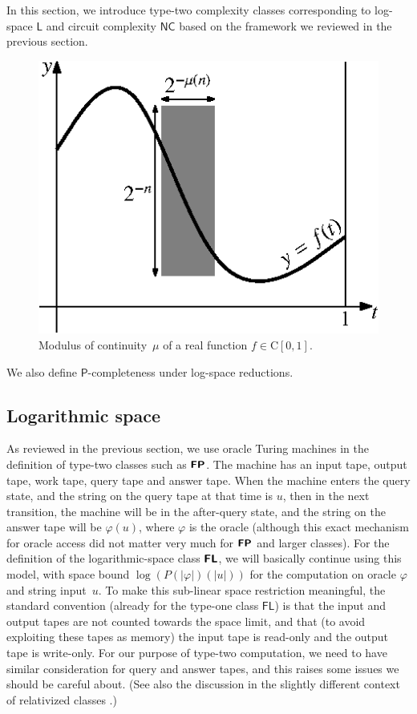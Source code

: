 \documentclass[envcountsect,envcountsame,orivec,oribibl]{llncs}
\newcommand{\classonefont}[1]{\mathsf{#1}}
\newcommand{\classL}{\classonefont{L}}
\newcommand{\classFL}{\classonefont{FL}}
\newcommand{\classP}{\classonefont{P}}
\newcommand{\classNC}{\classonefont{NC}}
\newcommand{\classtwofont}[1]{\text{\bfseries \sffamily \upshape #1}}
\newcommand{\classFLtwo}{\classtwofont{FL}}
\newcommand{\classFPtwo}{\classtwofont{FP}}
\newcommand{\classC}{\mathrm C}
\begin{document}
In this section, we introduce type-two complexity classes
corresponding to log-space $\classL$ and circuit complexity $\classNC$
based on the framework we reviewed in the previous section.
\begin{figure}
\begin{center}
\includegraphics[scale=0.9]{./moc.eps}
\caption{Modulus of continuity~$\mu$ of a real function $f \in \classC [0, 1]$.}
\label{figure: moc}
\end{center}
\end{figure}
We also define $\classP$-completeness under log-space reductions.

\subsection{Logarithmic space}
\label{subsection: logspace}

As reviewed in the previous section, 
we use oracle Turing machines in the definition of type-two classes 
such as $\classFPtwo$. 
The machine has an input tape, output tape, work tape, query tape and answer tape. 
When the machine enters the query state, 
and the string on the query tape at that time is $u$, 
then in the next transition, 
the machine will be in the after-query state, and 
the string on the answer tape will be $\varphi (u)$, 
where $\varphi$ is the oracle
(although this exact mechanism for oracle access did not matter very much
for $\classFPtwo$ and larger classes). 
For the definition of 
the logarithmic-space class $\classFLtwo$, 
we will basically continue using this model, 
with space bound $\log (P (\lvert \varphi \rvert) (\lvert u \rvert))$
for the computation on oracle $\varphi$ and string input~$u$. 
To make this sub-linear space restriction meaningful, 
the standard convention (already for the type-one class $\classFL$) is that 
the input and output tapes are not counted towards the space limit, and that 
(to avoid exploiting these tapes as memory) 
the input tape is read-only and the output tape is write-only. 
For our purpose of type-two computation, 
we need to have similar consideration for query and answer tapes, 
and this raises some issues we should be careful about. 
(See also the discussion in the slightly different context of relativized classes 
\cite{aehlig2007relativizing,buss1988relativized,ladner1976relativization,wilson1988measure}.)
\end{document}
